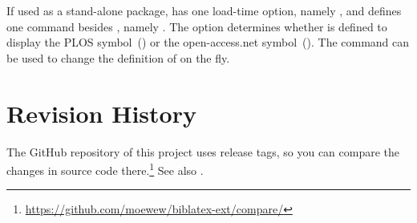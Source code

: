\documentclass[DIV=9]{scrartcl}
\newcommand*{\gitbaseurl}{https://github.com/moewew/biblatex-ext}
\begin{document}
If used as a stand-alone package,  has one
load-time option, namely , and defines one command besides
, namely .
The option determines whether  is defined to display
the PLOS symbol~()
or the open-access.net symbol~().
The command  can be used to change the definition
of  on the fly.




\clearpage
\section{Revision History}\label{sec:log}
The GitHub repository of this project uses release tags, so you can compare
the changes in source code there.\footnote{\url{\gitbaseurl/compare/}}
See also .
\end{document}
